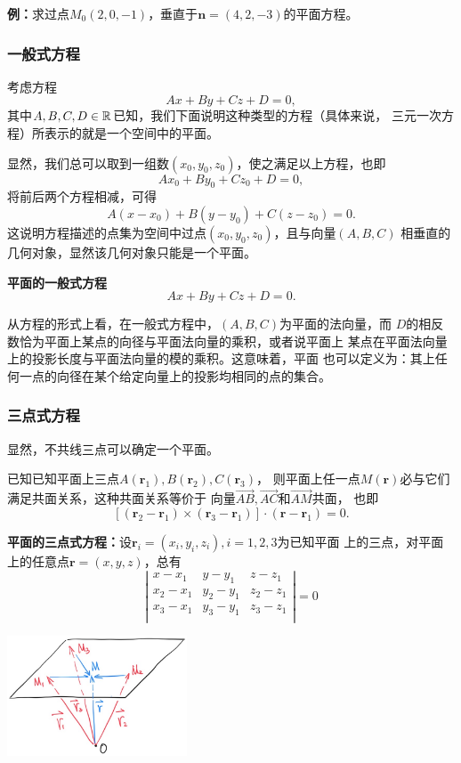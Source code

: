 {\bf 例：}求过点$M_0(2,0,-1)$，垂直于$\bm{n}=(4,2,-3)$的平面方程。

\subsubsection{一般式方程}

考虑方程
$$Ax+By+Cz+D=0,$$
其中$A,B,C,D\in\mathbb{{R}}$已知，我们下面说明这种类型的方程（具体来说，
三元一次方程）所表示的就是一个空间中的平面。

显然，我们总可以取到一组数$(x_0,y_0,z_0)$，使之满足以上方程，也即
$$Ax_0+By_0+Cz_0+D=0,$$
将前后两个方程相减，可得
$$A(x-x_0)+B(y-y_0)+C(z-z_0)=0.$$
这说明方程描述的点集为空间中过点$(x_0,y_0,z_0)$，且与向量$(A,B,C)$
相垂直的几何对象，显然该几何对象只能是一个平面。

\begin{thx}
	{\bf 平面的一般式方程}
	$$Ax+By+Cz+D=0.$$
\end{thx}

从方程的形式上看，在一般式方程中，$(A,B,C)$为平面的法向量，而
$D$的相反数恰为平面上某点的向径与平面法向量的乘积，或者说平面上
某点在平面法向量上的投影长度与平面法向量的模的乘积。这意味着，平面
也可以定义为：{\kaishu 其上任何一点的向径在某个给定向量上的投影均相同的点的集合}。

\subsubsection{三点式方程}

显然，不共线三点可以确定一个平面。

已知已知平面上三点$A(\bm{r}_1),B(\bm{r}_2),C(\bm{r}_3)$，
则平面上任一点$M(\bm{r})$必与它们满足共面关系，这种共面关系等价于
向量$\overrightarrow{AB},\overrightarrow{AC}$和$\overrightarrow{AM}$共面，
也即
$$[(\bm{r}_2-\bm{r}_1)\times(\bm{r}_3-\bm{r}_1)]\cdot(\bm{r}-\bm{r}_1)=0.$$

\begin{thx}
	{\bf 平面的三点式方程：}设$\bm{r}_i=(x_i,y_i,z_i),i=1,2,3$为已知平面
	上的三点，对平面上的任意点$\bm{r}=(x,y,z)$，总有
	$$\left|\begin{array}{ccc}
	x-x_1 & y-y_1 & z-z_1\\
	x_2-x_1 & y_2-y_1 & z_2-z_1\\
	x_3-x_1 & y_3-y_1 & z_3-z_1\\
	\end{array}\right|
	=0
	$$
\end{thx}

\begin{center}
	\includegraphics[width=0.4\textwidth]{./images/ch8/p3r.jpg}
\end{center}

